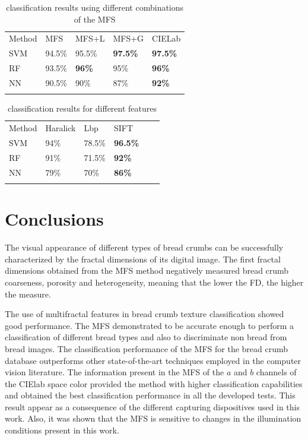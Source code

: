 \begin{table}
\caption{classification results using different combinations of the MFS}
\label{tab:mfs}       %
\begin{tabular}{lllll}
\hline\noalign{\smallskip}
Method & MFS & MFS+L & MFS+G & CIELab  \\
\noalign{\smallskip}\hline\noalign{\smallskip}
SVM & 94.5\% & 95.5\% & \textbf{97.5\%} & \textbf{97.5\%} \\
RF  & 93.5\% & \textbf{96\%} & 95\% & \textbf{96\%} \\
NN & 90.5\% & 90\% & 87\% & \textbf{92\%} \\
\noalign{\smallskip}\hline
\end{tabular}
\end{table}


\begin{table}
\caption{classification results for different features}
\label{tab:other}       %
\begin{tabular}{llllll}
\hline\noalign{\smallskip}
Method & Haralick & Lbp & SIFT\\ %
\noalign{\smallskip}\hline\noalign{\smallskip}
SVM & 94\% & 78.5\% & \textbf{96.5\%} \\ %
RF  & 91\% & 71.5\% & \textbf{92\%} \\ %
NN & 79\% & 70\% & \textbf{86\%} \\ %
\noalign{\smallskip}\hline
\end{tabular}
\end{table}




\section{Conclusions}
\label{sec:11}
The visual appearance of different types of bread crumbs can be successfully characterized by the fractal dimensions of its digital image. The first fractal dimensions obtained from the MFS method negatively measured bread crumb coarseness, porosity and heterogeneity, meaning that the lower the FD, the higher the measure. 


The use of multifractal features in bread crumb texture classification showed good performance. The MFS demonstrated to be accurate enough to perform a classification of different bread types and also to discriminate non bread from bread images. The classification performance of the MFS for the bread crumb database outperforms other state-of-the-art techniques employed in the computer vision literature. The information present in the MFS of the $a$ and $b$ channels of the CIElab space color provided the method with higher classification capabilities and obtained the best classification performance in all the developed tests. This result appear as a consequence of the different capturing dispositives used in this work. Also, it was shown that the MFS is sensitive to changes in the illumination conditions present in this work.

